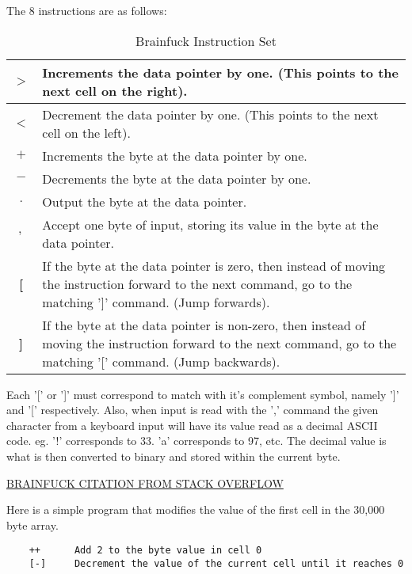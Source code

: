 The 8 instructions are as follows:
\begin{table}[h!tb]
    \centering
    \begin{tabular}{|c|p{10cm}|}
        \hline
        \textbf{$>$} & Increments the data pointer by one. (This points to the next cell on the right). \\
        \hline
        \textbf{$<$} & Decrement the data pointer by one. (This points to the next cell on the left). \\
        \hline
        \textbf{$+$} & Increments the byte at the data pointer by one. \\
        \hline
        \textbf{$-$} & Decrements the byte at the data pointer by one. \\
        \hline
        \textbf{$.$} & Output the byte at the data pointer. \\
        \hline
        \textbf{$,$} & Accept one byte of input, storing its value in the byte at the data pointer.\\
        \hline
        \textbf{[} & If the byte at the data pointer is zero, then instead of moving the instruction forward to the next command, go to the matching ']' command. (Jump forwards). \\
        \hline
        \textbf{]} & If the byte at the data pointer is non-zero, then instead of moving the instruction forward to the next command, go to the matching '[' command. (Jump backwards). \\
        \hline
    \end{tabular}
    \caption{Brainfuck Instruction Set}
    \label{tab:BrainfuckInstructionSet}
\end{table}

Each '[' or ']' must correspond to match with it's complement symbol, namely ']' and '[' respectively.
Also, when input is read with the ',' command the given character from a keyboard input will have its value read as a decimal ASCII code.
eg. '!' corresponds to 33. 'a' corresponds to 97, etc.
The decimal value is what is then converted to binary and stored within the current byte.

\href{https://stackoverflow.com/questions/16836860/how-does-the-brainfuck-hello-world-actually-work/19869651#19869651}{BRAINFUCK CITATION FROM STACK OVERFLOW}

Here is a simple program that modifies the value of the first cell in the 30,000 byte array.

\begin{verbatim}
    ++      Add 2 to the byte value in cell 0
    [-]     Decrement the value of the current cell until it reaches 0
\end{verbatim}

